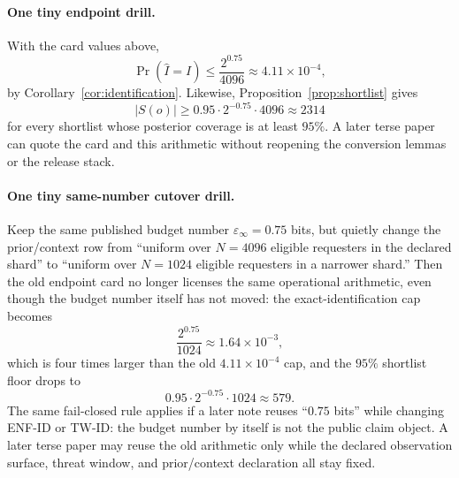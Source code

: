 \documentclass[11pt]{article}
\theoremstyle{definition}
\theoremstyle{remark}
\begin{document}
\paragraph{One tiny endpoint drill.}
With the card values above,
\[
\Pr(\widehat I = I) \le \frac{2^{0.75}}{4096} \approx 4.11\times 10^{-4},
\]
by Corollary~\ref{cor:identification}. Likewise, Proposition~\ref{prop:shortlist} gives
\[
|S(o)| \ge 0.95\cdot 2^{-0.75}\cdot 4096 \approx 2314
\]
for every shortlist whose posterior coverage is at least $95\%$. A later terse paper can quote the card and this arithmetic without reopening the conversion lemmas or the release stack.

\paragraph{One tiny same-number cutover drill.}
Keep the same published budget number $\varepsilon_\infty=0.75$ bits, but quietly change the prior/context row from ``uniform over $N=4096$ eligible requesters in the declared shard'' to ``uniform over $N=1024$ eligible requesters in a narrower shard.'' Then the old endpoint card no longer licenses the same operational arithmetic, even though the budget number itself has not moved: the exact-identification cap becomes
\[
\frac{2^{0.75}}{1024} \approx 1.64\times 10^{-3},
\]
which is four times larger than the old $4.11\times 10^{-4}$ cap, and the $95\%$ shortlist floor drops to
\[
0.95\cdot 2^{-0.75}\cdot 1024 \approx 579.
\]
The same fail-closed rule applies if a later note reuses ``$0.75$ bits'' while changing ENF-ID or TW-ID: the budget number by itself is not the public claim object. A later terse paper may reuse the old arithmetic only while the declared observation surface, threat window, and prior/context declaration all stay fixed.
\end{document}
